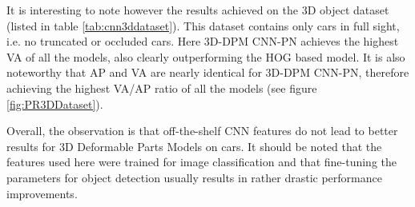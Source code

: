 
It is interesting to note however the results achieved on the 3D object dataset \cite{4408987} (listed in table \ref{tab:cnn3ddataset}). This dataset contains only cars in full sight, i.e. no truncated or occluded cars. Here 3D-DPM CNN-PN achieves the highest VA of all the models, also clearly outperforming the HOG based model. It is also noteworthy that AP and VA are nearly identical for 3D-DPM CNN-PN, therefore achieving the highest VA/AP ratio of all the models (see figure \ref{fig:PR3DDataset}).

Overall, the observation is that off-the-shelf CNN features do not lead to better results for 3D Deformable Parts Models on cars. It should be noted that the features used here were trained for image classification and that fine-tuning the parameters for object detection usually results in rather drastic performance improvements. 


